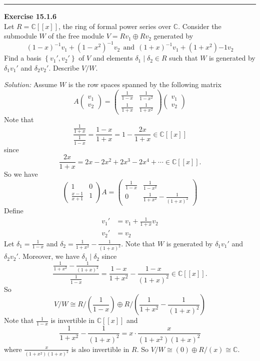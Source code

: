 \documentclass[a4paper, 12pt]{article}
\newenvironment{problem}[2][Exercise]
    { \begin{mdframed}[backgroundcolor=gray!20] \textbf{#1 #2} \\}
    {  \end{mdframed}}
\newenvironment{solution}
    {\textit{Solution:}}
    {}
\begin{document}
\noindent\rule{7in}{2.8pt}
\begin{problem}{15.1.6}
Let \(R=\mathbb{C}[[x]]\), the ring of formal power series over \(\mathbb{C}\). Consider the submodule \(W\) of the free module \(V=Rv_1\oplus Rv_2\) generated by 
\[(1-x)^{-1}v_1+(1-x^2)^{-1}v_2\ \ \text{and}\ \ (1+x)^{-1}v_1+(1+x^2){-1}v_2\]
Find a basis \(\left\{ v_1',v_2' \right\}\) of \(V\) and elements \(\delta_1\mid \delta_2\in R\) such that \(W\) is generated by \(\delta_1v_1'\) and \(\delta_2v_2'\). Describe \(V/W\).
\end{problem}
\begin{solution}
Assume \(W\) is the row spaces spanned by the following matrix 
\[A\begin{pmatrix}
v_1\\ 
v_2
\end{pmatrix}=\begin{pmatrix}
	\frac{1}{1-x}&\frac{1}{1-x^2}\\ 
	\frac{1}{1+x}&\frac{1}{1+x^2}
\end{pmatrix}\begin{pmatrix}
	v_1\\ 
	v_2
\end{pmatrix}\]
Note that 
\[\dfrac{\frac{1}{1+x}}{\frac{1}{1-x}}=\frac{1-x}{1+x}=1-\frac{2x}{1+x}\in \mathbb{C}[[x]]\]
since 
\[\frac{2x}{1+x}=2x-2x^2+2x^3-2x^4+\cdots \in \mathbb{C}[[x]].\]
So we have 
\[\begin{pmatrix}
1&0\\ 
\frac{x-1}{x+1}&1
\end{pmatrix}A=\begin{pmatrix}
	\frac{1}{1-x}&\frac{1}{1-x^2}\\ 
	0&\frac{1}{1+x^2}-\frac{1}{(1+x)^2}
\end{pmatrix}\]
Define 
\begin{align*}
	v_1'&=v_1+\frac{1}{1+x}v_2\\
	v_2'&=v_2 
\end{align*}
Let \(\delta_1=\frac{1}{1-x}\) and \(\delta_2=\frac{1}{1+x^2}-\frac{1}{(1+x)^2}\). Note that \(W\) is generated by \(\delta_1v_1'\) and \(\delta_2v_2'\). Moreover, we have 
\(\delta_1\mid \delta_2\) since 
\[\dfrac{\frac{1}{1+x^2}-\frac{1}{(1+x)^2}}{\frac{1}{1-x}}=\frac{1-x}{1+x^2}-\frac{1-x}{(1+x)^2}\in \mathbb{C}[[x]].\]
So 
\[V/W\cong R/(\frac{1}{1-x})\oplus R/(\frac{1}{1+x^2}-\frac{1}{(1+x)^2})\]
Note that \(\frac{1}{1-x}\) is invertible in \(\mathbb{C}[[x]]\) and 
\[\frac{1}{1+x^2}-\frac{1}{(1+x)^2}=x\cdot \frac{x}{(1+x^2)(1+x)^2}\]
where \(\frac{x}{(1+x^2)(1+x)^2}\) is also invertible in \(R\). So \(V/W\cong (0)\oplus R/(x)\cong \mathbb{C}\).
\end{solution}
\end{document}
